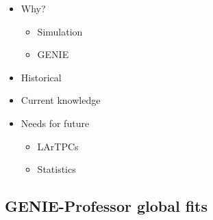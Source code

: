     
    \begin{itemize}

        \item Why?
        
        \begin{itemize}

            \item Simulation
            \item GENIE

        \end{itemize}
        
        \item Historical
        \item Current knowledge
        \item Needs for future
        
        \begin{itemize}

            \item LArTPCs
            \item Statistics

        \end{itemize}

    \end{itemize}

\subsection{GENIE-Professor global fits}


\clearpage

